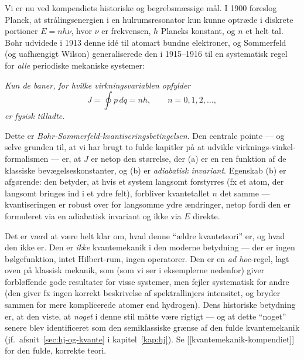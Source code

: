Vi er nu ved kompendiets historiske og begrebsmæssige mål. I 1900
foreslog Planck, at strålingsenergien i en hulrumsresonator kun kunne
optræde i diskrete portioner $E=nh\nu$, hvor $\nu$ er frekvensen,
$h$ Plancks konstant, og $n$ et helt tal. Bohr udvidede i 1913 denne
idé til atomart bundne elektroner, og Sommerfeld (og uafhængigt
Wilson) generaliserede den i 1915--1916 til en systematisk regel for
\emph{alle} periodiske mekaniske systemer:

\begin{center}
\emph{Kun de baner, for hvilke virkningsvariablen opfylder}
\begin{equation}
  \boxed{J = \oint p\,dq = nh, \qquad n=0,1,2,\dots,}
  \label{eq:bohr-sommerfeld}
\end{equation}
\emph{er fysisk tilladte.}
\end{center}

Dette er \emph{Bohr-Sommerfeld-kvantiseringsbetingelsen}. Den centrale
pointe — og selve grunden til, at vi har brugt to fulde kapitler på at
udvikle virknings-vinkel-formalismen — er, at $J$ er netop den
størrelse, der (a) er en ren funktion af de klassiske
bevægelseskonstanter, og (b) er \emph{adiabatisk invariant}. Egenskab
(b) er afgørende: den betyder, at hvis et system langsomt forstyrres
(fx et atom, der langsomt bringes ind i et ydre felt), forbliver
kvantetallet $n$ det samme — kvantiseringen er robust over for
langsomme ydre ændringer, netop fordi den er formuleret via en
adiabatisk invariant og ikke via $E$ direkte.

\begin{bemaerkning}
Det er værd at være helt klar om, hvad denne ``ældre kvanteteori'' er,
og hvad den ikke er. Den er \emph{ikke} kvantemekanik i den moderne
betydning — der er ingen bølgefunktion, intet Hilbert-rum, ingen
operatorer. Den er en \emph{ad hoc}-regel, lagt oven på klassisk
mekanik, som (som vi ser i eksemplerne nedenfor) giver forbløffende
gode resultater for visse systemer, men fejler systematisk for andre
(den giver fx ingen korrekt beskrivelse af spektrallinjers intensitet,
og bryder sammen for mere komplicerede atomer end hydrogen). Dens
historiske betydning er, at den viste, at \emph{noget} i denne stil
måtte være rigtigt — og at dette ``noget'' senere blev identificeret som
den semiklassiske grænse af den fulde kvantemekanik (jf.\
afsnit~\ref{sec:hj-og-kvante} i kapitel~\ref{kap:hj}). Se
[[kvantemekanik-kompendiet]] for den fulde, korrekte teori.
\end{bemaerkning}

